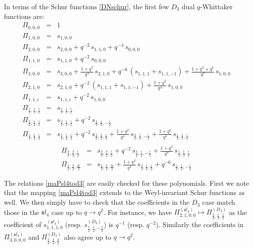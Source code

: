 \documentclass[12pt]{amsart}
\numberwithin{equation}{section}
\numberwithin{table}{section}
\begin{document}
\begin{appendix}
In terms of the Schur functions \eqref{DNschur}, the first few $D_3$ dual $q$-Whittaker functions are:
\begin{eqnarray*}
\Pi_{0,0,0}&=&1\\
\Pi_{1,0,0}&=&s_{1,0,0}\\
\Pi_{2,0,0}&=&s_{2,0,0}+q^{-2}\, s_{1,1,0}+q^{-4}\,s_{0,0,0}\\
\Pi_{1,1,0}&=&s_{1,1,0}+q^{-2}\,s_{0,0,0}\\
\Pi_{3,0,0}&=&s_{3,0,0}+\frac{1+q^2}{q^4}\, s_{2,1,0}+ q^{-6}\, (s_{1,1,1}+s_{1,1,-1})+\frac{1+q^2+q^4}{q^8}\,s_{1,0,0}\\
\Pi_{2,1,0}&=&s_{2,1,0}+q^{-2}\, (s_{1,1,1}+s_{1,1,-1})+\frac{1+q^2}{q^4}\,s_{1,0,0}\\
\Pi_{1,1,\epsilon}&=&s_{1,1,\epsilon}+q^{-2}\, s_{1,0,0}\\
\Pi_{\frac{1}{2},\frac{1}{2},\frac{\epsilon}{2}}&=&s_{\frac{1}{2},\frac{1}{2},\frac{\epsilon}{2}}\\
\Pi_{\frac{3}{2},\frac{1}{2},\frac{\epsilon}{2}}&=&s_{\frac{3}{2},\frac{1}{2},\frac{\epsilon}{2}}+q^{-2}\,
s_{\frac{1}{2},\frac{1}{2},-\frac{\epsilon}{2}}\\
\Pi_{\frac{5}{2},\frac{1}{2},\frac{\epsilon}{2}}&=&s_{\frac{5}{2},\frac{1}{2},\frac{\epsilon}{2}}+q^{-2}\,s_{\frac{3}{2},\frac{3}{2},\frac{\epsilon}{2}}+\frac{1+q^2}{q^4}\,
s_{\frac{3}{2},\frac{1}{2},-\frac{\epsilon}{2}}+\frac{1+q^2}{q^6}\,s_{\frac{1}{2},\frac{1}{2},\frac{\epsilon}{2}}\\
\end{eqnarray*}
\begin{eqnarray*}
\Pi_{\frac{3}{2},\frac{3}{2},\frac{\epsilon}{2}}&=&s_{\frac{3}{2},\frac{3}{2},\frac{\epsilon}{2}}+q^{-2}\,
s_{\frac{3}{2},\frac{1}{2},-\frac{\epsilon}{2}}+\frac{1+q^2}{q^4}\,s_{\frac{1}{2},\frac{1}{2},\frac{\epsilon}{2}}\\
\Pi_{\frac{3}{2},\frac{3}{2},\frac{3\epsilon}{2}}&=&s_{\frac{3}{2},\frac{3}{2},\frac{3\epsilon}{2}}+\frac{1+q^2}{q^4}\, s_{\frac{3}{2},\frac{1}{2},\frac{\epsilon}{2}}+q^{-6}\, s_{\frac{1}{2},\frac{1}{2},-\frac{\epsilon}{2}}
\end{eqnarray*}

The relations \eqref{maPsl4tod3} are easily checked for these polynomials. First we note that
the mapping \eqref{maPsl4tod3} extends to the Weyl-invariant Schur functions as well. We then simply have to
check that the coefficients in the $D_3$ case match those in the ${\mathfrak sl}_4$ case up to $q\to q^2$.
For instance, we have $\Pi_{2,1,0,0}^{({\mathfrak sl}_4)}\mapsto \Pi_{\frac{3}{2},\frac{1}{2},\frac{1}{2}}^{(D_3)}$
as the coefficient of $s_{1,1,1,0}^{({\mathfrak sl}_4)}$ (resp. $s_{\frac{1}{2},\frac{1}{2},-\frac{\epsilon}{2}}^{(D_3)}$) is $q^{-1}$ (resp. $q^{-2}$). Similarly the coefficients in $\Pi_{3,0,0,0}^{({\mathfrak sl}_4)}$ and $\Pi_{\frac{3}{2},\frac{3}{2},\frac{3}{2}}^{(D_3)}$ also agree up to $q\to q^2$.



\end{appendix}
\end{document}
